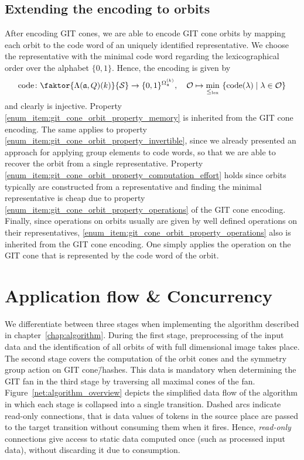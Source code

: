 \subsection*{Extending the encoding to orbits}
After encoding GIT cones, we are able to encode GIT cone orbits by mapping each orbit to the code word of an uniquely identified representative. We choose the representative with the minimal code word regarding the lexicographical order over the alphabet $\{0,1\}$. Hence, the encoding is given by
$$\code\colon \faktor{\Lambda(\mathfrak{a},Q)(k)}{\S} \rightarrow \{0,1\}^{\Omega_\mathfrak{a}^{(k)}},\quad
\O \mapsto \min\limits_{\leq_\text{lex}}\ \{\code(\lambda) \mid \lambda\in\O\}$$
and clearly is injective. Property \ref{enum_item:git_cone_orbit_property_memory} is inherited from the GIT cone encoding. The same applies to property \ref{enum_item:git_cone_orbit_property_invertible}, since we already presented an approach for applying group elements to code words, so that we are able to recover the orbit from a single representative. Property \ref{enum_item:git_cone_orbit_property_computation_effort} holds since orbits typically are constructed from a representative and finding the minimal representative is cheap due to property \ref{enum_item:git_cone_orbit_property_operations} of the GIT cone encoding. Finally, since operations on orbits usually are given by well defined operations on their representatives, \ref{enum_item:git_cone_orbit_property_operations} also is inherited from the GIT cone encoding. One simply applies the operation on the GIT cone that is represented by the code word of the orbit.

\section{Application flow \& Concurrency}

We differentiate between three stages when implementing the algorithm described in chapter~\ref{chap:algorithm}. During the first stage, preprocessing of the input data and the identification of all orbits of \afaces{} with full dimensional image takes place. The second stage covers the computation of the orbit cones and the symmetry group action on GIT cone\=/hashes. This data is mandatory when determining the GIT fan in the third stage by traversing all maximal cones of the fan. Figure~\ref{net:algorithm_overview} depicts the simplified data flow of the algorithm in which each stage is collapsed into a single transition. Dashed arcs indicate read-only connections, that is data values of tokens in the source place are passed to the target transition without consuming them when it fires. Hence, \emph{read-only} connections give access to static data computed once (such as processed input data), without discarding it due to consumption.

